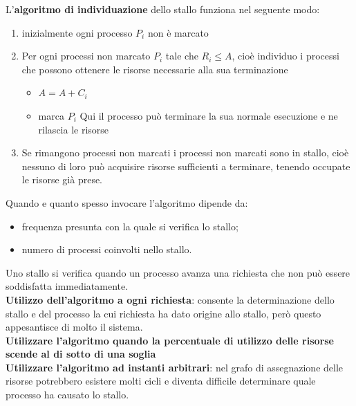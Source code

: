 \documentclass[12pt, letterpaper]{report}
\begin{document}
	L'\textbf{algoritmo di individuazione} dello stallo funziona nel seguente modo:
	\begin{enumerate}
		\item inizialmente ogni processo $P_i$ non è marcato
		\item Per ogni processi non marcato $P_i$ tale che $R_i \leq A$, cioè individuo i processi che possono ottenere le risorse necessarie alla sua terminazione
		\begin{itemize}
			\item $A = A + C_i$
			\item marca $P_i$
		Qui il processo può terminare la sua normale esecuzione e ne rilascia le risorse
		\end{itemize}
		\item Se rimangono processi non marcati i processi non marcati sono in stallo, cioè nessuno di loro può acquisire risorse sufficienti a terminare, tenendo occupate le risorse già prese.
	\end{enumerate}
	Quando e quanto spesso invocare l'algoritmo dipende da:
	\begin{itemize}
		\item frequenza presunta con la quale si verifica lo stallo;
		\item numero di processi coinvolti nello stallo.
	\end{itemize}
	Uno stallo si verifica quando un processo avanza una richiesta che non può essere soddisfatta immediatamente. \\
	\textbf{Utilizzo dell'algoritmo a ogni richiesta}: consente la determinazione dello stallo e del processo la cui richiesta ha dato origine allo stallo, però questo appesantisce di molto il sistema. \\
	\textbf{Utilizzare l'algoritmo quando la percentuale di utilizzo delle risorse scende al di sotto di una soglia} \\
	\textbf{Utilizzare l'algoritmo ad instanti arbitrari}: nel grafo di assegnazione delle risorse potrebbero esistere molti cicli e diventa difficile determinare quale processo ha causato lo stallo.
\end{document}
